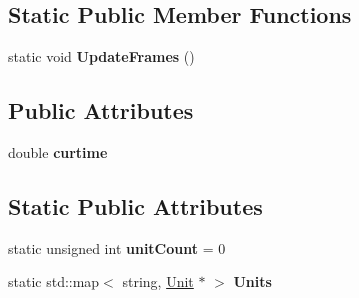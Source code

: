 \subsection*{Static Public Member Functions}
\begin{DoxyCompactItemize}
\item 
static void {\bfseries Update\+Frames} ()\hypertarget{classMeshAnimation_ac610344f80f84ee7a75edbaa1010eca5}{}\label{classMeshAnimation_ac610344f80f84ee7a75edbaa1010eca5}

\end{DoxyCompactItemize}
\subsection*{Public Attributes}
\begin{DoxyCompactItemize}
\item 
double {\bfseries curtime}\hypertarget{classMeshAnimation_a4203b6efee95e719763bbad6e9cf11cf}{}\label{classMeshAnimation_a4203b6efee95e719763bbad6e9cf11cf}

\end{DoxyCompactItemize}
\subsection*{Static Public Attributes}
\begin{DoxyCompactItemize}
\item 
static unsigned int {\bfseries unit\+Count} = 0\hypertarget{classMeshAnimation_ac4488165f322d59a0e2f2848713c43fa}{}\label{classMeshAnimation_ac4488165f322d59a0e2f2848713c43fa}

\item 
static std\+::map$<$ string, \hyperlink{classUnit}{Unit} $\ast$ $>$ {\bfseries Units}\hypertarget{classMeshAnimation_a6d2e59ab8413b670e019a9d70fdf0fdf}{}\label{classMeshAnimation_a6d2e59ab8413b670e019a9d70fdf0fdf}

\end{DoxyCompactItemize}
